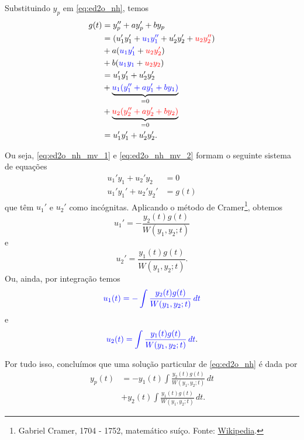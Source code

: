Substituindo $y_p$ em \eqref{eq:ed2o_nh}, temos
\begin{align}
  g(t) &= y_p'' + ay_p' + by_p \\
       &= \left(u_1'y_1' + {\color{blue}u_1y_1''} + u_2'y_2' + {\color{red}u_2y_2''} \right) \\
       &+ a({\color{blue}u_1y_1'} + {\color{red}u_2y_2'}) \\
       &+ b({\color{blue}u_1y_1} + {\color{red}u_2y_2}) \\
       &= u_1'y_1' + u_2'y_2' \\
       &+ \underbrace{{\color{blue}u_1(y_1'' + ay_1' + by_1)}}_{=0} \\
       &+ \underbrace{{\color{red}u_2(y_2'' + ay_2' + by_2)}}_{=0} \\
       &= u_1'y_1' + u_2'y_2'. \label{eq:ed2o_nh_mv_2}
\end{align}

Ou seja, \eqref{eq:ed2o_nh_mv_1} e \eqref{eq:ed2o_nh_mv_2} formam o seguinte sistema de equações
\begin{align}
  u_1'y_1 + u_2'y_2 &= 0\\
  u_1'y_1' + u_2'y_2' &= g(t)
\end{align}
que têm $u_1'$ e $u_2'$ como incógnitas. Aplicando o método de Cramer\footnote{Gabriel Cramer, 1704 - 1752, matemático suíço. Fonte: \href{https://en.wikipedia.org/wiki/Gabriel_Cramer}{Wikipedia}.}, obtemos
\begin{equation}
  u_1' = -\frac{y_2(t)g(t)}{W(y_1,y_2;t)}
\end{equation}
e
\begin{equation}
  u_2' = \frac{y_1(t)g(t)}{W(y_1,y_2;t)}.
\end{equation}
Ou, ainda, por integração temos
\begin{equation}\label{eq:ed2o_nh_vp_u1}
  {\color{blue}u_1(t) = -\int \frac{y_2(t)g(t)}{W(y_1,y_2;t)}\,dt}
\end{equation}
e
\begin{equation}\label{eq:ed2o_nh_vp_u2}
  {\color{blue}u_2(t) = \int \frac{y_1(t)g(t)}{W(y_1,y_2;t)}\,dt}.
\end{equation}

Por tudo isso, concluímos que uma solução particular de \eqref{eq:ed2o_nh} é dada por
\begin{align}
  y_p(t) &= -y_1(t)\int \frac{y_2(t)g(t)}{W(y_1,y_2;t)}\,dt \\
         &+ y_2(t)\int \frac{y_1(t)g(t)}{W(y_1,y_2;t)}\,dt.
\end{align}

